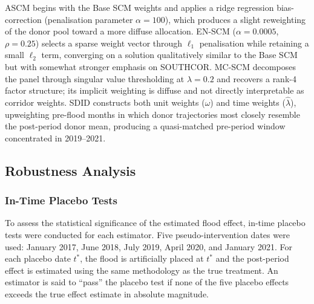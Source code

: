 ASCM begins with the Base SCM weights and applies a ridge regression
bias-correction (penalisation parameter $\alpha = 100$), which
produces a slight reweighting of the donor pool toward a more
diffuse allocation.
EN-SCM ($\alpha = 0.0005$, $\rho = 0.25$) selects a sparse weight
vector through $\ell_1$ penalisation while retaining a small
$\ell_2$ term, converging on a solution qualitatively similar to the
Base SCM but with somewhat stronger emphasis on SOUTHCOR.
MC-SCM decomposes the panel through singular value thresholding at
$\lambda = 0.2$ and recovers a rank-4 factor structure; its implicit
weighting is diffuse and not directly interpretable as corridor
weights.
SDID constructs both unit weights ($\hat{\omega}$) and time weights
($\hat{\lambda}$), upweighting pre-flood months in which donor
trajectories most closely resemble the post-period donor mean,
producing a quasi-matched pre-period window concentrated in 2019--2021.

\subsection{Robustness Analysis}
\label{sec:res_robustness}

\subsubsection{In-Time Placebo Tests}

To assess the statistical significance of the estimated flood effect,
in-time placebo tests were conducted for each estimator.
Five pseudo-intervention dates were used: January 2017, June 2018,
July 2019, April 2020, and January 2021.
For each placebo date $t^*$, the flood is artificially placed at $t^*$
and the post-period effect is estimated using the same methodology as
the true treatment.
An estimator is said to ``pass'' the placebo test if none of the five
placebo effects exceeds the true effect estimate in absolute magnitude.

